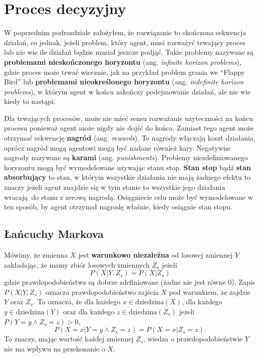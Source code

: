 \documentclass[a4paper, 12pt,oneside]{book}
\begin{document}
\section{Proces decyzyjny}
W poprzednim podrozdziale założyłem, że rozwiązanie to skończona sekwencja
działań, co jednak, jeżeli problem, który agent, musi rozważyć trwający proces
lub nie wie ile działań będzie musiał jeszcze podjąć. Takie problemy nazywane
są \textbf{problemami nieskończonego horyzontu} (ang. \textit{infinite horizon
problems}), gdzie proces może trwać wiecznie, jak na przykład problem grania
we ``Flappy Bird'' lub \textbf{problemami nieokreślonego horyzontu} (ang.
\textit{indefinite horizon problems}), w którym agent w końcu zakończy
podejmowanie działań, ale nie wie kiedy to nastąpi.

Dla trwających procesów, może nie mieć sensu rozważanie użyteczności na końcu
procesu ponieważ agent może nigdy nie dojść do końca. Zamiast tego agent może
otrzymać sekwencję \textbf{nagród} (ang. \textit{rewards}). Te nagrody włączają
koszt działania, oprócz nagród mogą agentowi mogą być nadane również kary.
Negatywne nagrody nazywane są \textbf{karami} (ang. \textit{punishments}).
Problemy niezdefiniowanego horyzontu mogą być wymodelowane używając stanu
stop. \textbf{Stan stop} bądź \textbf{stan absorbujący} to stan, w którym
wszystkie działania nie mają żadnego efektu to znaczy jeżeli agent znajdzie
się w tym stanie to wszystkie jego działania wracają do stanu z zerową nagrodą.
Osiągniecie celu może być wymodelowane w ten sposób, by agent otrzymał nagrodę
właśnie, kiedy osiągnie stan stopu.

\subsection{Łańcuchy Markova}
Mówimy, że zmienna $X$ jest \textbf{warunkowo niezależna} od losowej zmiennej
$Y$ zakładając, że mamy zbiór losowych zmiennych $Z_s$ jeżeli
\[P(X | Y, Z_s) = P(X| Z_s)\]
gdzie prawdopodobieństwa są dobrze zdefiniowane (żadne nie jest równe $0$).
Zapis $P(X| Y, Z_s)$ oznacza prawdopodobieństwo zajścia $X$ pod
warunkiem, że zajdzie $Y$ oraz $Z_s$. To oznacza, że dla każdego $x \in
\text{dziedzina}(X)$, dla każdego $y \in \text{dziedzina}(Y)$ oraz dla każdego
$z \in \text{dziedzina}(Z_s)$ jeżeli $P(Y = y \wedge Z_s = z) > 0,$
\[P(X=x|Y=y \wedge Z_s = z) = P(X=x|Z_s = z).\]
To znaczy, mając wartość każdej zmiennej $Z_s$, wiedza o prawdopodobieństwie
$Y$ nie ma wpływu na przekonanie o $X$.
\end{document}
